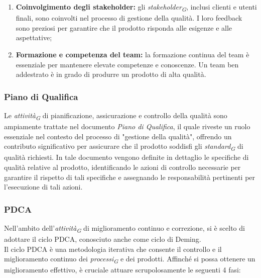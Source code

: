 \begin{enumerate}
    \item \textbf{Coinvolgimento degli stakeholder:}
        gli \textit{stakeholder}\textsubscript{\textit{G}}, inclusi clienti e utenti finali, sono coinvolti nel processo di gestione della qualità. I loro feedback sono preziosi per garantire che il prodotto risponda alle esigenze e alle aspettative;

    \item \textbf{Formazione e competenza del team:}
        la formazione continua del team è essenziale per mantenere elevate competenze e conoscenze. Un team ben addestrato è in grado di produrre un prodotto di alta qualità.
\end{enumerate}
\pagebreak

\subsubsection{Piano di Qualifica}

Le \textit{attività}\textsubscript{\textit{G}} di pianificazione, assicurazione e controllo della qualità sono ampiamente trattate nel documento \textit{Piano di Qualifica}, il quale riveste un ruolo essenziale nel contesto del processo di "gestione della qualità", offrendo un contributo significativo per assicurare che il prodotto soddisfi gli \textit{standard}\textsubscript{\textit{G}} di qualità richiesti. In tale documento vengono definite in dettaglio le specifiche di qualità relative al prodotto, identificando le azioni di controllo necessarie per garantire il rispetto di tali specifiche e assegnando le responsabilità pertinenti per l'esecuzione di tali azioni.

\subsubsection{PDCA}
Nell'ambito dell'\textit{attività}\textsubscript{\textit{G}} di miglioramento continuo e correzione, si è scelto di adottare il ciclo PDCA, conosciuto anche come ciclo di Deming. \\
Il ciclo PDCA è una metodologia iterativa che consente il controllo e il miglioramento continuo dei \textit{processi}\textsubscript{\textit{G}} e dei prodotti. Affinché si possa ottenere un miglioramento effettivo, è cruciale attuare scrupolosamente le seguenti 4 fasi:

